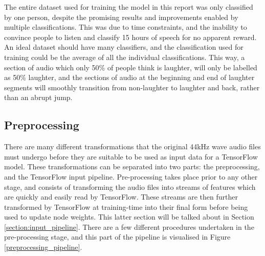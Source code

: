 \documentclass[a4paper,11pt,notitlepage]{article}
\begin{document}
\noindent
The entire dataset used for training the model in this report was only classified by one person, despite the promising results and improvements enabled by multiple classifications. This was due to time constraints, and the inability to convince people to listen and classify 15 hours of speech for no apparent reward. An ideal dataset should have many classifiers, and the classification used for training could be the average of all the individual classifications. This way, a section of audio which only 50\% of people think is laughter, will only be labelled as 50\% laughter, and the sections of audio at the beginning and end of laughter segments will smoothly transition from non-laughter to laughter and back, rather than an abrupt jump.

\subsection{Preprocessing}


There are many different transformations that the original 44kHz wave audio files must undergo before they are suitable to be used as input data for a TensorFlow model. These transformations can be separated into two parts: the preprocessing, and the TensorFlow input pipeline. Pre-processing takes place prior to any other stage, and consists of transforming the audio files into streams of features which are quickly and easily read by TensorFlow. These streams are then further transformed by TensorFlow at training-time into their final form before being used to update node weights. This latter section will be talked about in Section \ref{section:input_pipeline}. There are a few different procedures undertaken in the pre-processing stage, and this part of the pipeline is visualised in Figure \ref{preprocessing_pipeline}.
\end{document}
